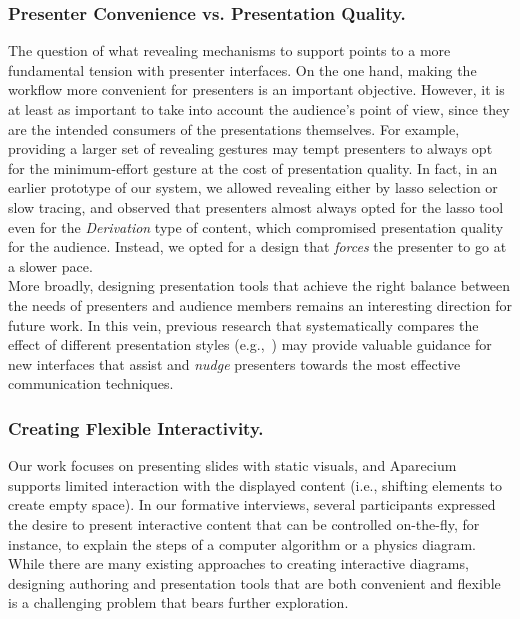\subsubsection{Presenter Convenience vs. Presentation Quality.} 
The question of what revealing mechanisms to support points to a more fundamental tension with presenter interfaces. On the one hand, making the workflow more convenient for presenters is an important objective. However, it is at least as important to take into account the audience's point of view, since they are the intended consumers of the presentations themselves. For example, providing a larger set of revealing gestures may tempt presenters to always opt for the minimum-effort gesture at the cost of presentation quality. In fact, in an earlier prototype of our system, we allowed revealing either by lasso selection or slow tracing, and observed that presenters almost always opted for the lasso tool even for the \textit{Derivation} type of content, which compromised presentation quality for the audience. Instead, we opted for a design that \textit{forces} the presenter to go at a slower pace.\\

More broadly, designing presentation tools that achieve the right balance between the needs of presenters and audience members remains an interesting direction for future work. In this vein, previous research that systematically compares the effect of different presentation styles (e.g.,~\cite{seth2010powerpoint, cross2013typerighting}) may provide valuable guidance for new interfaces that assist and \emph{nudge} presenters towards the most effective communication techniques.

\subsubsection{Creating Flexible Interactivity.} 
Our work focuses on presenting slides with static visuals, and Aparecium supports limited interaction with the displayed content (i.e., shifting elements to create empty space). In our formative interviews, several participants expressed the desire to present interactive content that can be controlled on-the-fly, for instance, to explain the steps of a computer algorithm or a physics diagram. 
%
While there are many existing approaches to creating interactive diagrams, designing authoring and presentation tools that are both convenient and flexible is a challenging problem that bears further exploration.

